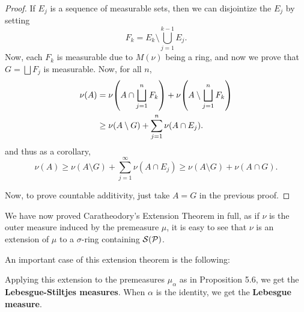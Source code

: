 \begin{proof}
    If $E_j$ is a sequence of measurable sets, then we can disjointize the $E_j$ by setting \[F_k = E_k \setminus \bigcup_{j = 1}^{k - 1} E_j.\] Now, each $F_k$ is measurable due to $M(\nu)$ being a ring, and now we prove that $G = \bigsqcup F_j$ is measurable. Now, for all $n$, \begin{align*}
        \nu(A) &= \nu\qty(A \cap \bigsqcup_{j = 1}^n F_k) + \nu\qty(A \setminus \bigsqcup_{j = 1}^n F_k)\\ 
        &\ge \nu(A \setminus G) + \sum_{j = 1}^n \nu(A \cap E_j).
    \end{align*}
    and thus as a corollary, \[\nu(A) \ge \nu(A \setminus G) + \sum_{j = 1}^\infty \nu(A \cap E_j) \ge \nu(A \setminus G) + \nu(A \cap G).\]

    Now, to prove countable additivity, just take $A = G$ in the previous proof.
\end{proof}

We have now proved Caratheodory's Extension Theorem in full, as if $\nu$ is the outer measure induced by the premeasure $\mu$, it is easy to see that $\nu$ is an extension of $\mu$ to a $\sigma$-ring containing $\mathcal S(\mathcal P)$. 

An important case of this extension theorem is the following:

\begin{example}
    Applying this extension to the premeasures $\mu_\alpha$ as in Proposition 5.6, we get the \textbf{Lebesgue-Stiltjes measures}. When $\alpha$ is the identity, we get the \textbf{Lebesgue measure}.
\end{example}

